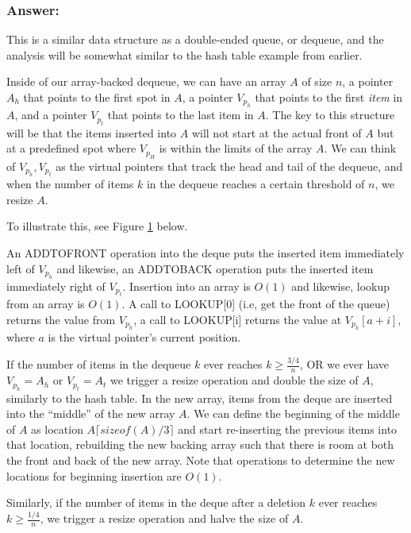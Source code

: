 \documentclass[titlepage]{article}\usepackage[]{graphicx}\usepackage[]{color}
\begin{document}
\subsubsection{Answer:}
This is a similar data structure as a double-ended queue, or dequeue, and the
analysis will be somewhat similar to the hash table example from earlier. 

Inside of our array-backed dequeue, we can have an array $A$ of size $n$, a pointer
$A_h$ that points to the first spot in $A$, a pointer $V_{p_h}$ that points to
the first \textit{item} in $A$, and a pointer $V_{p_t}$ that points to the last
item in $A$. The key to this structure will be that the items inserted into $A$
will not start at the actual front of $A$ but at a predefined spot where
$V_{p_H}$ is within the limits of the array $A$. We can think of $V_{p_h},
V_{p_t}$ as the virtual pointers that track the head and tail of the dequeue,
and when the number of items $k$ in the dequeue reaches a certain threshold of
$n$, we resize $A$. 

To illustrate this, see Figure \ref{fig:deque} below.

\begin{figure}
	\label{fig:deque}

\end{figure}
An ADDTOFRONT operation into the deque puts the inserted item immediately left of
$V_{p_h}$ and likewise, an ADDTOBACK operation puts the inserted item
immediately right of $V_{p_t}$. Insertion into an array is $O(1)$ and likewise,
lookup from an array is $O(1)$. A call to LOOKUP[0] (i.e, get the front of the
queue) returns the value from $V_{p_h}$, a call to LOOKUP[i] returns the value
at $V_{p_h}[a+i]$, where $a$ is the virtual pointer's current position.

If the number of items in the dequeue $k$ ever reaches $ k \geq \frac{3/4}n$,
OR we ever have $V_{p_h} = A_h$ or $V_{p_t} = A_t$ we trigger a resize
operation and double the size of $A$, similarly to the hash table. In the new
array, items from the deque are inserted into the ``middle'' of the new array
$A$. We can define the beginning of the middle of $A$ as location
$A\lceil sizeof(A)/3 \rceil $ and start re-inserting the previous items into that location,
rebuilding the new backing array such that there is room at both the front
and back of the new array. Note that operations to determine the new
locations for beginning insertion are $O(1)$.

Similarly, if the number of items in the deque after a deletion $k$ 
ever reaches $ k \geq \frac{1/4}n$, we trigger a resize
operation and halve the size of $A$. 
\end{document}
